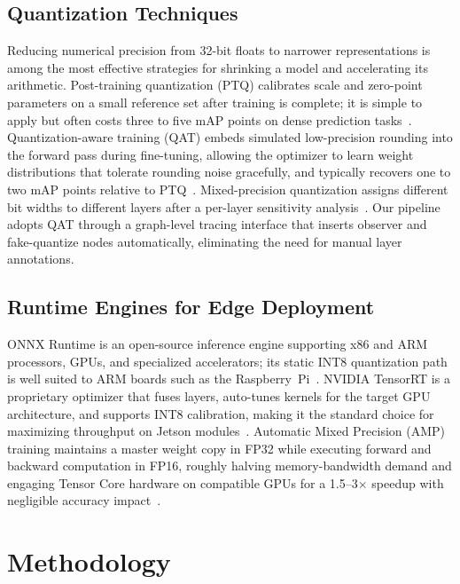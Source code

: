 \documentclass[conference]{IEEEtran}
\begin{document}
\subsection{Quantization Techniques}

Reducing numerical precision from 32-bit floats to narrower representations is among the most effective strategies for shrinking a model and accelerating its arithmetic. Post-training quantization (PTQ) calibrates scale and zero-point parameters on a small reference set after training is complete; it is simple to apply but often costs three to five mAP points on dense prediction tasks~\cite{b10}. Quantization-aware training (QAT) embeds simulated low-precision rounding into the forward pass during fine-tuning, allowing the optimizer to learn weight distributions that tolerate rounding noise gracefully, and typically recovers one to two mAP points relative to PTQ~\cite{b11}. Mixed-precision quantization assigns different bit widths to different layers after a per-layer sensitivity analysis~\cite{b12}. Our pipeline adopts QAT through a graph-level tracing interface that inserts observer and fake-quantize nodes automatically, eliminating the need for manual layer annotations.

\subsection{Runtime Engines for Edge Deployment}

ONNX Runtime is an open-source inference engine supporting x86 and ARM processors, GPUs, and specialized accelerators; its static INT8 quantization path is well suited to ARM boards such as the Raspberry~Pi~\cite{b13}. NVIDIA TensorRT is a proprietary optimizer that fuses layers, auto-tunes kernels for the target GPU architecture, and supports INT8 calibration, making it the standard choice for maximizing throughput on Jetson modules~\cite{b14}. Automatic Mixed Precision (AMP) training maintains a master weight copy in FP32 while executing forward and backward computation in FP16, roughly halving memory-bandwidth demand and engaging Tensor Core hardware on compatible GPUs for a 1.5--3$\times$ speedup with negligible accuracy impact~\cite{b15}.


\section{Methodology}
\end{document}

